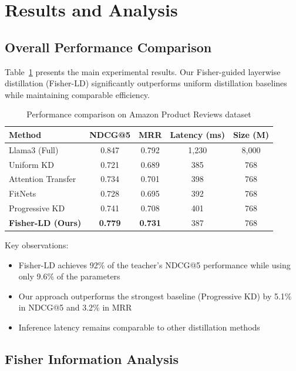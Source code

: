 \documentclass[10pt,conference]{IEEEtran}
\begin{document}
\section{Results and Analysis}

\subsection{Overall Performance Comparison}

Table~\ref{tab:main_results} presents the main experimental results. Our Fisher-guided layerwise distillation (Fisher-LD) significantly outperforms uniform distillation baselines while maintaining comparable efficiency.

\begin{table}[t]
\centering
\caption{Performance comparison on Amazon Product Reviews dataset}
\label{tab:main_results}
\begin{tabular}{lcccc}
\toprule
Method & NDCG@5 & MRR & Latency (ms) & Size (M) \\
\midrule
Llama3 (Full) & 0.847 & 0.792 & 1,230 & 8,000 \\
Uniform KD & 0.721 & 0.689 & 385 & 768 \\
Attention Transfer & 0.734 & 0.701 & 398 & 768 \\
FitNets & 0.728 & 0.695 & 392 & 768 \\
Progressive KD & 0.741 & 0.708 & 401 & 768 \\
\textbf{Fisher-LD (Ours)} & \textbf{0.779} & \textbf{0.731} & 387 & 768 \\
\bottomrule
\end{tabular}
\end{table}

Key observations:
\begin{itemize}
    \item Fisher-LD achieves 92\% of the teacher's NDCG@5 performance while using only 9.6\% of the parameters
    \item Our approach outperforms the strongest baseline (Progressive KD) by 5.1\% in NDCG@5 and 3.2\% in MRR
    \item Inference latency remains comparable to other distillation methods
\end{itemize}

\subsection{Fisher Information Analysis}
\end{document}
